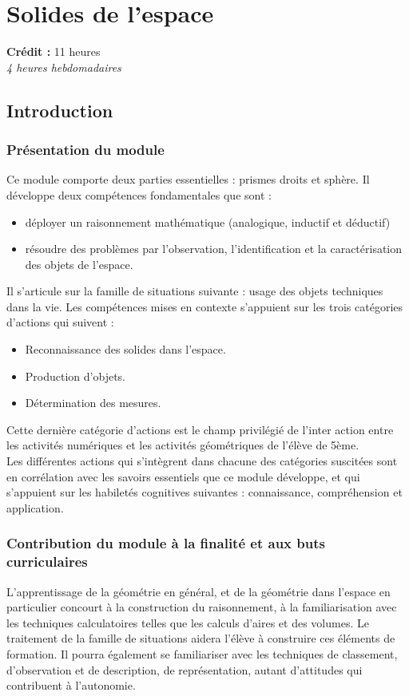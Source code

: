\chapter{Solides de l'espace}

{\AlegreyaSansLight \large
\begin{center}
\textbf{Crédit :} 11 heures\\
\textit{4 heures hebdomadaires}
\end{center}
}

\minitoc

\section{Introduction}

\subsection{Présentation du module}
Ce module comporte deux parties essentielles : prismes droits et sphère. Il développe deux compétences fondamentales que sont :
\begin{itemize}
\item déployer un raisonnement mathématique (analogique, inductif et déductif)
\item résoudre des problèmes par l'observation, l'identification et la caractérisation des objets de l'espace.
\end{itemize}
Il s'articule sur la famille de situations suivante : usage des objets techniques dans la vie. Les compétences mises en contexte s'appuient sur les trois catégories d'actions qui suivent :
\begin{itemize}
\item Reconnaissance des solides dans l'espace.
\item Production d'objets.
\item Détermination des mesures.
\end{itemize}
Cette dernière catégorie d'actions est le champ privilégié de l'inter action entre les activités numériques et les activités géométriques de l'élève de 5ème.\\
Les différentes actions qui s'intègrent dans chacune des catégories suscitées sont en corrélation avec les savoirs essentiels que ce module développe, et qui s'appuient sur les habiletés cognitives suivantes : connaissance, compréhension et application.
\subsection{Contribution du module à la finalité et aux buts curriculaires}
L'apprentissage de la géométrie en général, et de la géométrie dans l'espace en particulier concourt à la construction du raisonnement, à la familiarisation avec les techniques calculatoires telles que les calculs d'aires et des volumes. Le traitement de la famille de situations aidera l'élève à construire ces éléments de formation. Il pourra également se familiariser avec les techniques de classement, d'observation et de description, de représentation, autant d'attitudes qui contribuent à l'autonomie.
